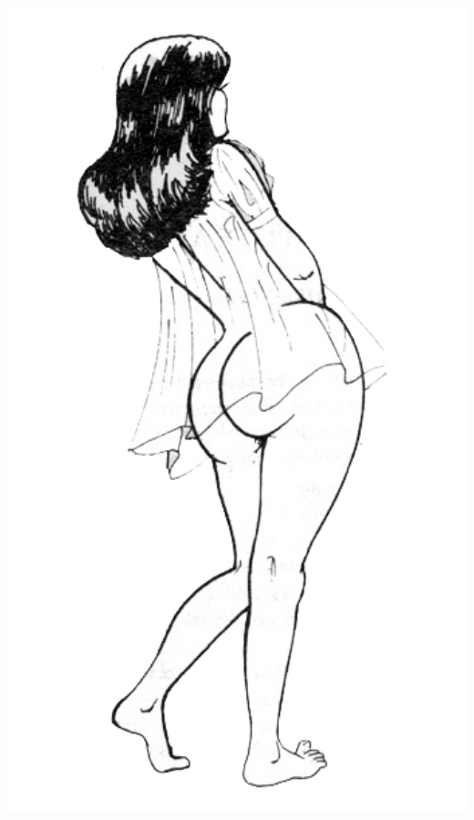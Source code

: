 \begin{minipage}{0.5\textwidth}
\begin{center}
\includegraphics[width=1.2\textwidth]{images/mariee.png}
\end{center}
\end{minipage}

\breakpage